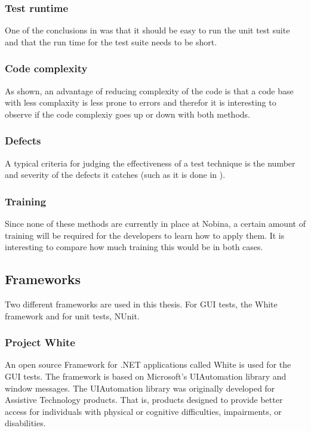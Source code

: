 \documentclass{article}
\begin{document}
			\subsubsection{Test runtime}
			One of the conclusions in \cite{unit} was that it should be easy to run the unit test suite and that the run time for the test suite needs to be short. 

			\subsubsection{Code complexity}
			As shown, an advantage of reducing complexity of the code is that a code base with less complaxity is less prone to errors and therefor it is interesting to observe if the code complexiy goes up or down with both methods.   

			\subsubsection{Defects}
			A typical criteria for judging the effectiveness of a test technique is the number and severity of the defects it catches (such as it is done in \cite{unit}). 

			\subsubsection{Training}
			Since none of these methods are currently in place at Nobina, a certain amount of training will be required for the developers to learn how to apply them. It is interesting to compare how much training this would be in both cases.

		\subsection{Frameworks}

			Two different frameworks are used in this thesis. For GUI tests, the White framework and for unit tests, NUnit. 

			\subsubsection{Project White}
			An open source Framework for .NET applications called White is used for the GUI tests. The framework is based on Microsoft's UIAutomation library and window messages. The UIAutomation library was originally developed for Assistive Technology products. That is, products designed to provide better access for individuals with physical or cognitive difficulties, impairments, or disabilities. \cite{white}
\end{document}
